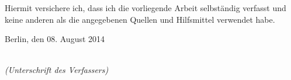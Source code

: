 
\newpage
\thispagestyle{empty}

\begin{large}

\vspace*{2cm}

\noindent
Hiermit versichere ich, dass ich die vorliegende Arbeit
selbst\"andig verfasst und keine anderen als die angegebenen Quellen
und Hilfsmittel verwendet habe.

\vspace{2cm}

\noindent
Berlin, den 08. August 2014

\vspace{3cm}

\hspace*{7cm}%
\dotfill\\
\hspace*{8.5cm}%
\textit{(Unterschrift des Verfassers)}

\end{large}
